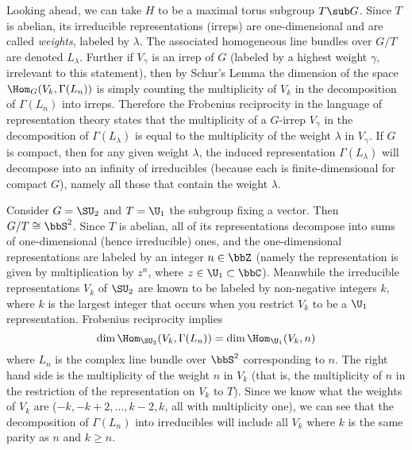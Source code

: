\begin{example}
    Looking ahead, we can take $H$ to be a maximal torus subgroup $T\sub G$. Since $T$ is abelian, its irreducible representations (irreps) are one-dimensional and are called \emph{weights}, labeled by $\lambda$. The associated homogeneous line bundles over $G\slash T$ are denoted $L_\lambda$. Further if $V_\gamma$ is an irrep of $G$ (labeled by a highest weight $\gamma$, irrelevant to this statement), then by Schur's Lemma the dimension of the space $\Hom_G(V_k,\Gamma(L_n))$ is simply counting the multiplicity of $V_k$ in the decomposition of $\Gamma(L_n)$ into irreps. Therefore the Frobenius reciprocity in the language of representation theory states that the multiplicity of a $G$-irrep $V_\gamma$ in the decomposition of $\Gamma(L_\lambda)$ is equal to the multiplicity of the weight $\lambda$ in $V_\gamma$. If $G$ is compact, then for any given weight $\lambda$, the induced representation $\Gamma(L_\lambda)$ will decompose into an infinity of irreducibles (because each is finite-dimensional for compact $G$), namely all those that contain the weight $\lambda$.

    Consider $G=\SU_2$ and $T=\U_1$ the subgroup fixing a vector. Then $G\slash T\cong \bbS^2$. Since $T$ is abelian, all of its representations decompose into sums of one-dimensional (hence irreducible) ones, and the one-dimensional representations are labeled by an integer $n\in\bbZ$ (namely the representation is given by multiplication by $z^n$, where $z\in\U_1\subset \bbC$). Meanwhile the irreducible representations $V_k$ of $\SU_2$ are known to be labeled by non-negative integers $k$, where $k$ is the largest integer that occurs when you restrict $V_k$ to be a $\U_1$ representation. Frobenius reciprocity implies
    \[\dim\Hom_{\SU_2}(V_k,\Gamma(L_n))=\dim \Hom_{\U_1}(V_k,n)\]
    where $L_n$ is the complex line bundle over $\bbS^2$ corresponding to $n$. The right hand side is the multiplicity of the weight $n$ in $V_k$ (that is, the multiplicity of $n$ in the restriction of the representation on $V_k$ to $T$). Since we know what the weights of $V_k$ are ($-k,-k+2,\ldots,k-2,k$, all with multiplicity one), we can see that the decomposition of $\Gamma(L_n)$ into irreducibles will include all $V_k$ where $k$ is the same parity as $n$ and $k\geq n$.


\end{example}
